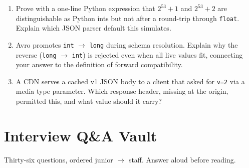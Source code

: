 \begin{enumerate}[label=\textbf{E4.\arabic*}, leftmargin=1.5cm]
        \texttt{object\_pairs\_hook}, and use it to demonstrate a first-wins vs.\
        last-wins parser differential on \texttt{\{"a": 1, "a": 2\}}.
  \item Prove with a one-line Python expression that $2^{53}+1$ and $2^{53}+2$ are
        distinguishable as Python ints but not after a round-trip through
        \texttt{float}. Explain which JSON parser default this simulates.
  \item Avro promotes \texttt{int} $\to$ \texttt{long} during schema resolution.
        Explain why the reverse (\texttt{long} $\to$ \texttt{int}) is rejected even
        when all live values fit, connecting your answer to the definition of
        forward compatibility.
  \item A CDN serves a cached v1 JSON body to a client that asked for
        \texttt{v=2} via a media type parameter. Which response header, missing at
        the origin, permitted this, and what value should it carry?
\end{enumerate}

\section{Interview Q\&A Vault}
\label{sec:ch4-interview}

Thirty-six questions, ordered junior $\to$ staff. Answer aloud before reading.

